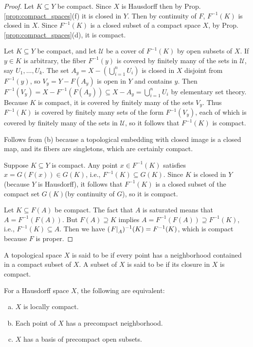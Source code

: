 \documentclass[11pt,a4paper]{article}
\begin{document}
\begin{proof}
 Let $K\subseteq Y$ be compact. Since $X$ is Hausdorff then by Prop. \ref{prop:compact_spaces}(f) it is closed in $Y$. Then by continuity of $F$, $F^{-1}(K)$ is closed in $X$. Since $F^{-1}(K)$ is a closed subset of a compact space $X$, by Prop. \ref{prop:compact_spaces}(d), it is compact.

 Let $K\subseteq Y$ be compact, and let $\mathcal{U}$ be a cover of $F^{-1}(K)$ by open subsets of $X$. If $y\in K$ is arbitrary, the fiber $F^{-1}(y)$ is covered by finitely many of the sets in $\mathcal{U}$, say $U_1,\ldots,U_k$. The set $A_y = X-(\bigcup_{i=1}^n U_i)$ is closed in $X$ disjoint from $F^{-1}(y)$, so $V_y = Y-F(A_y)$ is open in $Y$ and contains $y$. Then $F^{-1}(V_y) = X - F^{-1}(F(A_y))\subseteq X-A_y = \bigcup_{i=1}^n U_i$ by elementary set theory. Because $K$ is compact, it is covered by finitely many of the sets $V_y$. Thus $F^{-1}(K)$ is covered by finitely many sets of the form $F^{-1}(V_y)$, each of which is covered by finitely many of the sets in $\mathcal{U}$, so it follows that $F^{-1}(K)$ is compact.

 Follows from (b) because a topological embedding with closed image is a closed map, and its fibers are singletons, which are certainly compact.

 Suppose $K\subseteq Y$ is compact. Any point $x\in F^{-1}(K)$ satisfies $x = G(F(x))\in G(K)$, i.e., $F^{-1}(K)\subseteq G(K)$. Since $K$ is closed in $Y$ (because $Y$ is Hausdorff), it follows that $F^{-1}(K)$ is a closed subset of the compact set $G(K)$(by continuity of $G$), so it is compact.

 Let $K\subseteq F(A)$ be compact. The fact that $A$ is saturated means that $A = F^{-1}(F(A))$. But $F(A)\supseteq K$ implies $A = F^{-1}(F(A))\supseteq F^{-1}(K)$, i.e., $F^{-1}(K)\subseteq A$. Then we have $(\left.F\right|_{A})^{-1}(K) = F^{-1}(K)$, which is compact because $F$ is proper.
\end{proof}

\begin{mydef}
A topological space $X$ is said to be  if every point has a neighborhood contained in a compact subset of $X$. A subset of $X$ is said to be  if its closure in $X$ is compact.
\end{mydef}

\begin{prop}
For a Hausdorff space $X$, the following are equivalent:
\begin{enumerate}[(a)]
    \item $X$ is locally compact.
    \item Each point of $X$ has a precompact neighborhood.
    \item $X$ has a basis of precompact open subsets.
\end{enumerate}
\end{prop}
\end{document}
